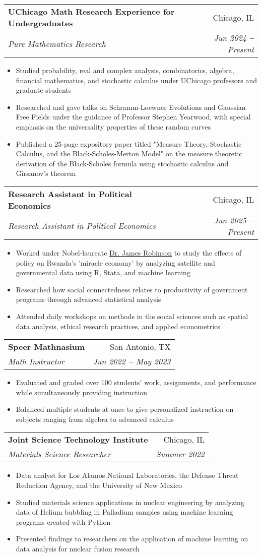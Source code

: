 \documentclass[letterpaper,11pt]{article}
\makeatletter
\newcommand{\resumeItem}[1]{
  \item\small{
    {#1 \vspace{-2pt}}
  }
}
\newcommand{\resumeSubheading}[4]{
  \vspace{-2pt}\item
    \begin{tabular*}{0.97\textwidth}[t]{l@{\extracolsep{\fill}}r}
      \textbf{#1} & #2 \\
      \textit{\small#3} & \textit{\small #4} \\
    \end{tabular*}\vspace{-7pt}
}
\newcommand{\resumeItemListStart}{\begin{itemize}}
\newcommand{\resumeItemListEnd}{\end{itemize}\vspace{-5pt}}
\makeatother
\begin{document}
    \resumeSubheading
      {\textbf{UChicago Math Research Experience for Undergraduates}}{Chicago, IL}
      {Pure Mathematics Research}{Jun 2024 \textbf{--} Present}
        \resumeItemListStart
            \resumeItem{Studied probability, real and complex analysis, combinatorics, algebra, financial mathematics, and stochastic calculus under UChicago professors and graduate students}
            \resumeItem{Researched and gave talks on Schramm-Loewner Evolutions and Gaussian Free Fields under the guidance of Professor Stephen Yearwood, with special emphasis on the universality properties of these random curves}
            \resumeItem{Published a 25-page expository paper titled "Measure Theory, Stochastic Calculus, and the Black-Scholes-Merton Model" on the measure theoretic derivation of the Black-Scholes formula using stochastic calculus and Girsanov's theorem}
        \resumeItemListEnd

    \resumeSubheading
      {Research Assistant in Political Economics}{Chicago, IL}
      {Research Assistant in Political Economics}{Jun 2025 \textbf{--} Present}
        \resumeItemListStart
            \resumeItem{Worked under Nobel-laureate \href{https://voices.uchicago.edu/jamesrobinson/}{\color{blue} Dr. James Robinson} to study the effects of policy on Rwanda's 'miracle economy' by analyzing satellite and governmental data using R, Stata, and machine learning}
            \resumeItem{Researched how social connectedness relates to productivity of government programs through advanced statistical analysis}
            \resumeItem{Attended daily workshops on methods in the social sciences such as spatial data analysis, ethical research practices, and applied econometrics}
        \resumeItemListEnd

    \resumeSubheading
      {\textbf{Speer Mathnasium}}{San Antonio, TX}
      {Math Instructor}{Jun 2022 \textbf{--} May 2023}
        \resumeItemListStart
            \resumeItem{Evaluated and graded over 100 students' work, assignments, and performance while simultaneously providing instruction}
            \resumeItem{Balanced multiple students at once to give personalized instruction on subjects ranging from algebra to advanced calculus}
        \resumeItemListEnd

    \resumeSubheading
      {Joint Science Technology Institute}{Chicago, IL}
      {Materials Science Researcher}{Summer 2022}
        \resumeItemListStart
            \resumeItem{Data analyst for Los Alamos National Laboratories, the Defense Threat Reduction Agency, and the University of New Mexico}
            \resumeItem{Studied materials science applications in nuclear engineering by analyzing data of Helium bubbling in Palladium samples using machine learning programs created with Python}
            \resumeItem{Presented findings to researchers on the application of machine learning on data analysis for nuclear fusion research}
        \resumeItemListEnd
    
\end{document}
